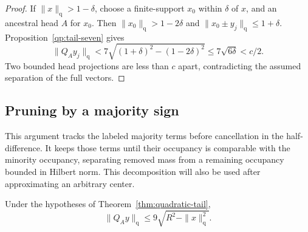 \begin{proof}
If $\|x\|_{\mathrm q}>1-\delta$, choose a finite-support $x_0$
within $\delta$ of $x$, and an ancestral head $A$ for $x_0$.
Then $\|x_0\|_{\mathrm q}>1-2\delta$ and
$\|x_0\pm y_j\|_{\mathrm q}\le1+\delta$.
Proposition~\ref{qp:tail-seven} gives
\[
 \|Q_Ay_j\|_{\mathrm q}
 <7\sqrt{(1+\delta)^2-(1-2\delta)^2}
 \le7\sqrt{6\delta}<c/2.
\]
Two bounded head projections are less than $c$ apart, contradicting
the assumed separation of the full vectors.
\end{proof}

\subsection{Pruning by a majority sign}

This argument tracks the labeled majority terms before cancellation in
the half-difference. It keeps those terms until their occupancy is
comparable with the minority occupancy, separating removed mass from
a remaining occupancy bounded in Hilbert norm. This decomposition will
also be used after approximating an arbitrary center.

\begin{proposition}\label{qp:tail-nine}
Under the hypotheses of Theorem~\ref{thm:quadratic-tail},
\[
 \|Q_Ay\|_{\mathrm q}\le9\sqrt{R^2-\|x\|_{\mathrm q}^2}.
\]
\end{proposition}

